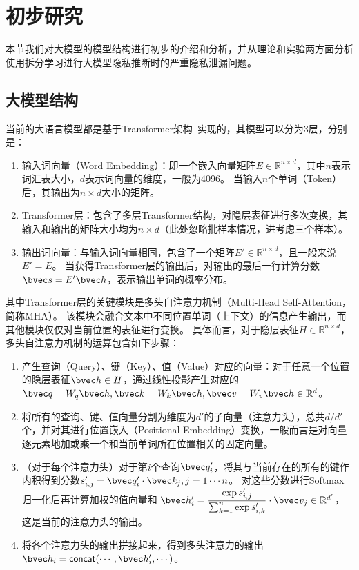 \section{初步研究}
本节我们对大模型的模型结构进行初步的介绍和分析，并从理论和实验两方面分析使用拆分学习进行大模型隐私推断时的严重隐私泄漏问题。

\subsection{大模型结构}
当前的大语言模型都是基于Transformer架构~\cite{vaswani_2017_attention}实现的，其模型可以分为3层，分别是：
\begin{enumerate}[label=(\arabic*)]
    \item 输入词向量（Word Embedding）：即一个嵌入向量矩阵$E \in \mathbb R^{n\times d}$，其中$n$表示词汇表大小，$d$表示词向量的维度，一般为4096。
    当输入$n$个单词（Token）后，其输出为$n \times d$大小的矩阵。
    \item Transformer层：包含了多层Transformer结构，对隐层表征进行多次变换，其输入和输出的矩阵大小均为$n \times d$（此处忽略批样本情况，进考虑三个样本）。
    \item 输出词向量：与输入词向量相同，包含了一个矩阵$E' \in \mathbb R^{n\times d}$，且一般来说$E' = E$。
    当获得Transformer层的输出后，对输出的最后一行计算分数$\bvec  s = E'\bvec h$，表示输出单词的概率分布。
\end{enumerate}

其中Transformer层的关键模块是多头自注意力机制（Multi-Head Self-Attention，简称MHA）。
%
该模块会融合文本中不同位置单词（上下文）的信息产生输出，而其他模块仅仅对当前位置的表征进行变换。
%
具体而言，对于隐层表征$H \in \mathbb R^{n\times d}$，多头自注意力机制的运算包含如下步骤：
\begin{enumerate}[label=(\arabic*)]
    \item 产生查询（Query）、键（Key）、值（Value）对应的向量：对于任意一个位置的隐层表征$\bvec h \in H$，通过线性投影产生对应的$\bvec q = W_q \bvec h, \bvec k = W_k \bvec h, \bvec v = W_v \bvec h \in \mathbb R^d$。
    \item 将所有的查询、键、值向量分割为维度为$d'$的子向量（注意力头），总共$d/d'$个，并对其进行位置嵌入（Positional Embedding）变换，一般而言是对向量逐元素地加或乘一个和当前单词所在位置相关的固定向量。
    \item （对于每个注意力头）对于第$i$个查询$\bvec q_i'$，将其与当前存在的所有的键作内积得到分数$s'_{i, j} = \bvec q_i' \cdot \bvec k_j, j = 1\cdots n$。
    对这些分数进行Softmax归一化后再计算加权的值向量和 $\bvec h'_i = \dfrac{\exp {s'_{i, j}}}{\sum_{k = 1}^n \exp {s'_{i, k}}} \cdot \bvec v_j \in \mathbb R^{d'}$，这是当前的注意力头的输出。
    \item 将各个注意力头的输出拼接起来，得到多头注意力的输出$\bvec h_i = \mathsf{concat}(\cdots, \bvec h'_i, \cdots)$。
\end{enumerate}

